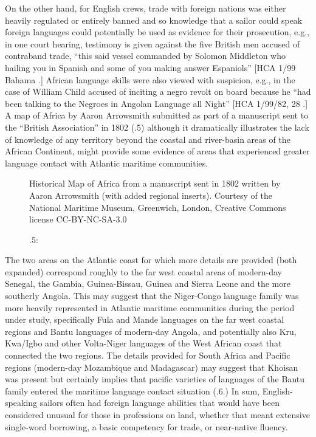   On the other hand, for English crews, trade with foreign nations was either heavily regulated or entirely banned and so knowledge that a sailor could speak foreign languages could potentially be used as evidence for their prosecution, e.g., in one court hearing, testimony is given against the five British men accused of contraband trade, “this said vessel commanded by Solomon Middleton who hailing you in Spanish and some of you making answer Espaniols” [HCA 1/99 Bahama \citealt{Islands1722}.] African language skills were also viewed with suspicion, e.g., in the case of William Child accused of inciting a negro revolt on board because he “had been talking to the Negroes in Angolan Language all Night” [HCA 1/99/82, 28 \citealt{March1722}.] A map of Africa by Aaron Arrowsmith submitted as part of a manuscript sent to the “British Association” in 1802 (.5) although it dramatically illustrates the lack of knowledge of any territory beyond the coastal and river-basin areas of the African Continent, might provide some evidence of areas that experienced greater language contact with Atlantic maritime communities. 

\begin{figure}
 

{\caption{\label{fig:key:3}.5:}}{ Historical} Map of Africa from a manuscript sent in 1802 written by Aaron Arrowsmith (with added regional inserts). Courtesy of the National Maritime Museum, Greenwich, London, Creative Commons license CC-BY-NC-SA-3.0
\end{figure}

The two areas on the Atlantic coast for which more details are provided (both expanded) correspond roughly to the far west coastal areas of modern-day Senegal, the Gambia, Guinea-Bissau, Guinea and Sierra Leone and the more southerly Angola. This may suggest that the Niger-Congo language family was more heavily represented in Atlantic maritime communities during the period under study, specifically Fula and Mande languages on the far west coastal regions and Bantu languages of modern-day Angola, and potentially also Kru, Kwa/Igbo and other Volta-Niger languages of the West African coast that connected the two regions. The details provided for South Africa and Pacific regions (modern-day Mozambique and Madagascar) may suggest that Khoisan was present but certainly implies that pacific varieties of languages of the Bantu family entered the maritime language contact situation (.6.) In sum, English-speaking sailors often had foreign language abilities that would have been considered unusual for those in professions on land, whether that meant extensive single-word borrowing, a basic competency for trade, or near-native fluency. 

